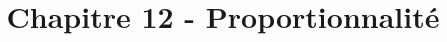 \documentclass[paper=a4, fontsize=9pt]{scrartcl} %
\title{	
  \vspace{-10ex}
  \horrule{0.5pt} \\[0.4cm] %
  \huge Chapitre 12 - Proportionnalité\\ %
  \horrule{2pt} \\[0.5cm] %
}
\author{}
\date{\vspace{-10ex}} %
\begin{document}

\newtheorem{Definition}{Définition}
\newtheorem{Theorem}{Théorème}
\newtheorem{Proposition}{Propriété}

\renewcommand{\labelitemi}{$\bullet$}
\renewcommand{\labelitemii}{$\circ$}

\maketitle %

\end{document}
